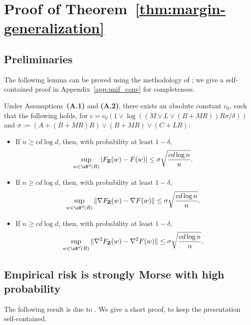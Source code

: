 \documentclass[final,12pt]{colt2018}
\numberwithin{equation}{section}
\numberwithin{equation}{section}
\def\deq{:=}
\def\bd#1{\mathbf{#1}}
\def\bZ{\bd{Z}}
\begin{document}
\section{Proof of Theorem~\ref{thm:margin-generalization}}

\subsection{Preliminaries}

The following lemma can be proved using the methodology of \cite*{mei2016landscape}; we give a self-contained proof in Appendix~\ref{app:unif_conv} for completeness.

\begin{lemma}\label{lm:unif_conv} Under Assumptions~{\bf (A.1)} and {\bf(A.2)}, there exists an absolute constant $c_0$, such that the following holds, for $c = c_0 \left(1 \vee \log((M\vee L\vee (B+MR))R\sigma/\delta)\right)$ and $\sigma  \deq (A+(B+MR)R) \vee (B + MR) \vee (C + LR)$:
\begin{itemize}
	\item If $n \ge cd\log d$, then, with probability at least $1-\delta$,
	\begin{align}\label{eq:risk_concentration}
	\sup_{w \in \sB^d(R)} |F_\bZ(w)-F(w)| \le \sigma \sqrt{\frac{cd\log n}{n}}.
	\end{align}
	\item If $n \ge cd\log d$, then, with probability at least $1-\delta$,
	\begin{align}\label{eq:uniform_grad_conv}
		\sup_{w \in \sB^d(R)}\| \nabla F_\bZ(w) - \nabla F(w)\| \le \sigma \sqrt{\frac{cd\log n}{n}}.
	\end{align}
	\item If $n \ge cd\log d$, then, with probability at least $1-\delta$,
	\begin{align}
	\sup_{w \in \sB^d(R)} \| \nabla^2 F_\bZ(w) - \nabla^2 F(w)\| \le \sigma \sqrt{\frac{cd \log n}{n}}.
	\end{align}
\end{itemize}
\end{lemma}


\subsection{Empirical risk is strongly Morse with high probability}

The following result is due to \cite*{mei2016landscape}. We give a short proof, to keep the presentation self-contained.
\end{document}
